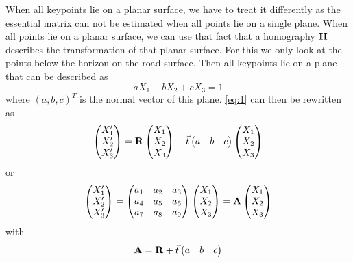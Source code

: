 When all keypoints lie on a planar surface, we have to treat it differently as the essential matrix can not be estimated when all points lie on a single plane. When all points lie on a planar surface, we can use that fact that a homography $\mathbf{H}$ describes the transformation of that planar surface. For this we only look at the points below the horizon on the road surface. Then all keypoints lie on a plane that can be described as
\begin{equation}
    aX_1 + bX_2 + cX_3 = 1
\end{equation}
where $(a, b, c)^T$ is the normal vector of this plane. \autoref{eq:1} can then be rewritten as 
\begin{equation}
    \begin{pmatrix}
        X_1' \\
        X_2' \\
        X_3'
    \end{pmatrix} = \mathbf{R}
    \begin{pmatrix}
        X_1 \\
        X_2 \\
        X_3
    \end{pmatrix} + \vec t
    \begin{pmatrix}
        a & b & c
    \end{pmatrix}
    \begin{pmatrix}
        X_1 \\
        X_2 \\
        X_3
    \end{pmatrix}
\end{equation}
or
\begin{equation}
    \begin{pmatrix}
        X_1' \\
        X_2' \\
        X_3'
    \end{pmatrix} =
    \begin{pmatrix}
        a_1 & a_2 & a_3 \\
        a_4 & a_5 & a_6 \\
        a_7 & a_8 & a_9 \\
    \end{pmatrix}
    \begin{pmatrix}
        X_1 \\
        X_2 \\
        X_3
    \end{pmatrix} = \mathbf{A}
    \begin{pmatrix}
        X_1 \\
        X_2 \\
        X_3
    \end{pmatrix}
\end{equation}
with
\begin{equation} \label{eq:matrixA}
    \mathbf{A} = \mathbf{R} + \vec t
    \begin{pmatrix}
        a & b & c
    \end{pmatrix}
\end{equation}

